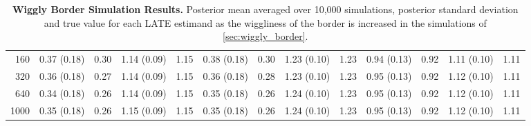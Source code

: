 \documentclass[letter,12pt]{article}
\begin{document}
\begin{landscape}
\begin{table}[!h]
\begin{tabular}{r|rrrrrrrrrrrr}
            160      & 0.37 (0.18) & 0.30    & 1.14 (0.09) & 1.15   & 0.38 (0.18) & 0.30   & 1.23 (0.10) & 1.23    & 0.94 (0.13) & 0.92   & 1.11 (0.10) & 1.11   \\
            320      & 0.36 (0.18) & 0.27    & 1.14 (0.09) & 1.15   & 0.36 (0.18) & 0.28   & 1.23 (0.10) & 1.23    & 0.95 (0.13) & 0.92   & 1.12 (0.10) & 1.11   \\
            640      & 0.34 (0.18) & 0.26    & 1.14 (0.09) & 1.15   & 0.35 (0.18) & 0.26   & 1.24 (0.10) & 1.23    & 0.95 (0.13) & 0.92   & 1.12 (0.10) & 1.11   \\
            1000     & 0.35 (0.18) & 0.26    & 1.15 (0.09) & 1.15   & 0.35 (0.18) & 0.26   & 1.24 (0.10) & 1.23    & 0.95 (0.13) & 0.92   & 1.12 (0.10) & 1.11 
            \\    \hline
        \end{tabular}
        \caption{
            \textbf{Wiggly Border Simulation Results.} 
            Posterior mean averaged over 10,000 simulations, posterior standard deviation and true value for each LATE estimand as the wiggliness of the border is increased in the simulations of \autoref{sec:wiggly_border}.
            \label{table:wiggly_results}
            }
    \end{table}


\end{landscape}
\end{document}
